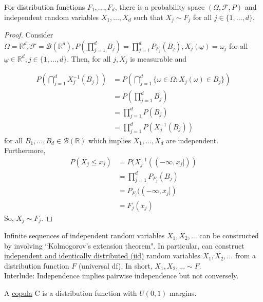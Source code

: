 \documentclass{article}
\newcommand{\R}{\mathbb{R}}
\newcommand{\inv}{^{-1}}
\begin{document}
	\begin{myprop}{}{}
		For distribution functions $F_1, \dots, F_d$, there is a probability space $(\Omega, \mathcal{F}, P)$ and independent random variables $X_1, \dots, X_d$ such that $X_j\sim F_j$ for all $j\in\{1, \dots, d\}$.
		
		\begin{proof}
			Consider $\Omega=\R^d, \mathcal{F}=\mathcal{B}(\R^d), P(\prod_{j=1}^{d}B_j)=\prod_{j=i}^{d}P_{F_j}(B_j), X_j(\underline{\omega})=\omega_j$ for all $\underline{\omega}\in\R^d, j\in\{1, \dots, d\}$. Then, for all $j, X_j$ is measurable and
			
			\begin{align*}
				P(\bigcap_{j=1}^{d}X_j\inv(B_j))&=P(\bigcap_{j=1}^{d}\{\omega\in\Omega : X_j(\omega)\in B_j\})\\
				&=P(\prod_{j=1}^{d}B_j)\\
				&=\prod_{j=1}^{d}P(B_j)\\
				&=\prod_{j=1}^{d}P(X_j\inv(B_j))
			\end{align*}
			for all $B_1, \dots, B_d\in\mathcal{B}(\R)$ which implies $X_1, \dots, X_d$ are independent.\\
			
			Furthermore,
			\begin{align*}
				P(X_j\leq x_j)&=P(X_j\inv((-\infty, x_j]))\\
				&=\prod_{j=1}^{d}P_{F_j}(B_j)\\
				&=P_{F_j}((-\infty, x_j])\\
				&=F_j(x_j)
			\end{align*}
			So, $X_j\sim F_j$.
		\end{proof}
	\end{myprop}
	
	Infinite sequences of independent random variables $X_1, X_2, \dots$ can be constructed by involving ``Kolmogorov's extension theorem". In particular, can construct \ul{independent and identically distributed (iid)} random variables $X_1, X_2, \dots$ from a distribution function $F$ (universal df). In short, $X_1, X_2, \dots\sim F$.\\
	
	Interlude: Independence implies pairwise independence but not conversely.
	
	\begin{mydef}{}{}
		A \ul{copula} C is a distribution function with $U(0, 1)$ margins.
	\end{mydef}
	
\end{document}

